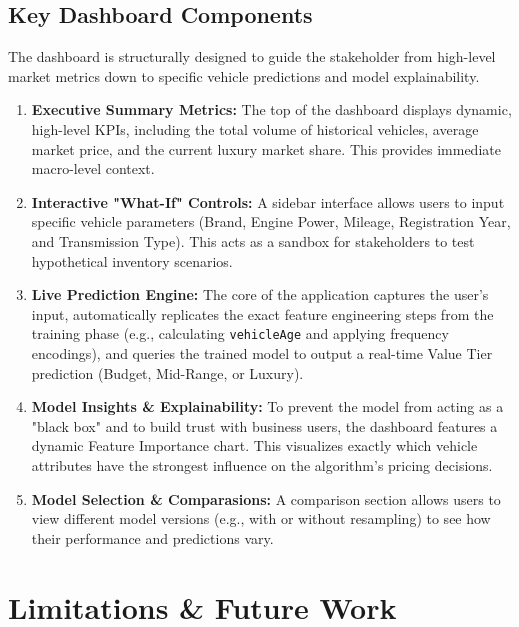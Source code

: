 \documentclass[12pt, a4paper]{article}
\begin{document}
\subsection{Key Dashboard Components}
The dashboard is structurally designed to guide the stakeholder from high-level market metrics down to specific vehicle predictions and model explainability.

\begin{enumerate}
  \item \textbf{Executive Summary Metrics:}
  The top of the dashboard displays dynamic, high-level KPIs, including the total volume of historical vehicles, average market price, and the current luxury market share. This provides immediate macro-level context.

  \item \textbf{Interactive "What-If" Controls:}
  A sidebar interface allows users to input specific vehicle parameters (Brand, Engine Power, Mileage, Registration Year, and Transmission Type). This acts as a sandbox for stakeholders to test hypothetical inventory scenarios.

  \item \textbf{Live Prediction Engine:}
  The core of the application captures the user's input, automatically replicates the exact feature engineering steps from the training phase (e.g., calculating \texttt{vehicleAge} and applying frequency encodings), and queries the trained model to output a real-time Value Tier prediction (Budget, Mid-Range, or Luxury).

  \item \textbf{Model Insights \& Explainability:}
  To prevent the model from acting as a "black box" and to build trust with business users, the dashboard features a dynamic Feature Importance chart. This visualizes exactly which vehicle attributes have the strongest influence on the algorithm's pricing decisions.

    \item \textbf{Model Selection \& Comparasions:}
    A comparison section allows users to view different model versions (e.g., with or without resampling) to see how their performance and predictions vary.
\end{enumerate}

\newpage
\section{Limitations \& Future Work}
\end{document}
